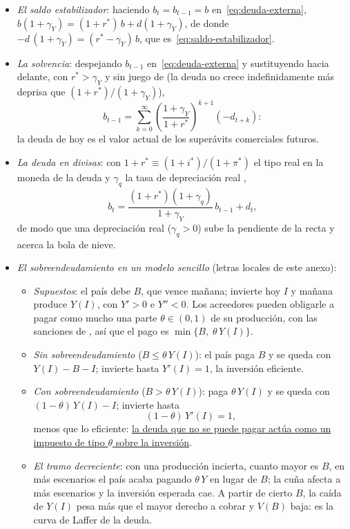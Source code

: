 \documentclass[11pt]{article}
\begin{document}
\begin{itemize}
\item \emph{El saldo estabilizador}: haciendo $b_t=b_{t-1}=b$ en~\eqref{eq:deuda-externa}, $b(1+\gamma_Y)=(1+r^*)\,b+d(1+\gamma_Y)$, de donde $-d\,(1+\gamma_Y)=(r^*-\gamma_Y)\,b$, que es~\eqref{eq:saldo-estabilizador}. \findemo
\item \emph{La solvencia}: despejando $b_{t-1}$ en~\eqref{eq:deuda-externa} y sustituyendo hacia delante, con $r^*>\gamma_Y$ y sin juego de  (la deuda no crece indefinidamente más deprisa que $(1+r^*)/(1+\gamma_Y)$),
  \[
  b_{t-1}=\sum_{k=0}^{\infty}\left(\frac{1+\gamma_Y}{1+r^*}\right)^{k+1}\left(-d_{t+k}\right):
  \]
  la deuda de hoy es el valor actual de los superávits comerciales futuros. \findemo
\item \emph{La deuda en divisas}: con $1+r^*\equiv(1+i^*)/(1+\pi^*)$ el tipo real en la moneda de la deuda y $\gamma_q$ la tasa de depreciación real ,
  \[
  b_t=\frac{(1+r^*)(1+\gamma_q)}{1+\gamma_Y}\,b_{t-1}+d_t ,
  \]
  de modo que una depreciación real ($\gamma_q>0$) sube la pendiente de la recta y acerca la bola de nieve.
\item \emph{El sobreendeudamiento en un modelo sencillo} (letras locales de este anexo):
  \begin{itemize}
  \item \emph{Supuestos}: el país debe $B$, que vence mañana; invierte hoy $I$ y mañana produce $Y\left(I\right)$, con $Y'>0$ e $Y''<0$. Los acreedores pueden obligarle a pagar como mucho una parte $\theta\in(0,1)$ de su producción, con las sanciones de \textcite{BulowRogoff1989JPE}, así que el pago es $\min\{B,\;\theta\,Y\left(I\right)\}$.
  \item \emph{Sin sobreendeudamiento} ($B\leq\theta\,Y\left(I\right)$): el país paga $B$ y se queda con $Y\left(I\right)-B-I$; invierte hasta $Y'\left(I\right)=1$, la inversión eficiente.
  \item \emph{Con sobreendeudamiento} ($B>\theta\,Y\left(I\right)$): paga $\theta\,Y\left(I\right)$ y se queda con $(1-\theta)\,Y\left(I\right)-I$; invierte hasta
    \[
    (1-\theta)\,Y'\left(I\right)=1 ,
    \]
    menos que lo eficiente: \uline{la deuda que no se puede pagar actúa como un impuesto de tipo $\theta$ sobre la inversión}. \findemo
  \item \emph{El tramo decreciente}: con una producción incierta, cuanto mayor es $B$, en más escenarios el país acaba pagando $\theta\,Y$ en lugar de $B$; la cuña afecta a más escenarios y la inversión esperada cae. A partir de cierto $B$, la caída de $Y\left(I\right)$ pesa más que el mayor derecho a cobrar y $V(B)$ baja: es la curva de Laffer de la deuda\nocite{Krugman1988Overhang,Sachs1989Overhang}.

\end{itemize}
\end{itemize}
\end{document}

